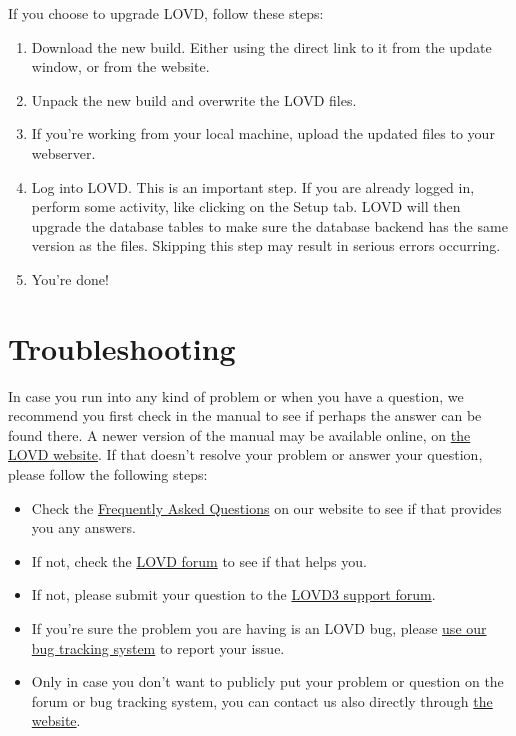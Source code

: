 \noindent
If you choose to upgrade LOVD, follow these steps:

\begin{enumerate} \itemsep0pt \parskip0pt
  \item Download the new build.
    Either using the direct link to it from the update window, or from the website.
  \item Unpack the new build and overwrite the LOVD files.
  \item If you're working from your local machine, upload the updated files to your webserver.
  \item Log into LOVD.
    This is an important step.
    If you are already logged in, perform some activity, like clicking on the Setup tab.
    LOVD will then upgrade the database tables to make sure the database backend has the same version as the files.
    Skipping this step may result in serious errors occurring.
  \item You're done!
\end{enumerate}










\hypertarget{chap:troubleshooting}{}
\chapter{Troubleshooting}
In case you run into any kind of problem or when you have a question, we recommend you first check in the manual to see if perhaps the answer can be found there.
A newer version of the manual may be available online, on \href{http://www.lovd.nl/3.0/docs/}{the LOVD website}.
If that doesn't resolve your problem or answer your question, please follow the following steps:
\begin{itemize}
  \item Check the \href{http://www.lovd.nl/3.0/faq}{Frequently Asked Questions} on our website to see if that provides you any answers.
  \item If not, check the \href{https://humgenprojects.lumc.nl/trac/LOVD3/discussion}{LOVD forum} to see if that helps you.
  \item If not, please submit your question to the \href{https://humgenprojects.lumc.nl/trac/LOVD3/discussion/forum/1}{LOVD3 support forum}.
  \item If you're sure the problem you are having is an LOVD bug, please \href{https://humgenprojects.lumc.nl/trac/LOVD3/report/1}{use our bug tracking system} to report your issue.
  \item Only in case you don't want to publicly put your problem or question on the forum or bug tracking system, you can contact us also directly through \href{http://www.lovd.nl/3.0/contact}{the website}.
\end{itemize}


